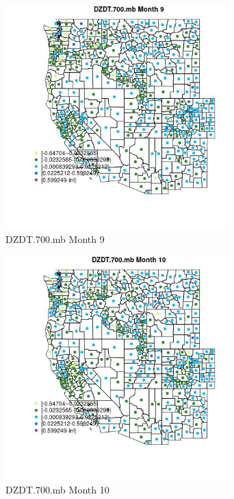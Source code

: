 \begin{figure} 
\centering  
\includegraphics[width=0.77\textwidth]{Code_Outputs/df_report_ML_predictors_CountyCentroid_Locations_Dates_2008-01-01to2018-12-31_MapObsMo9DZDT700mb.jpg} 
\caption{\label{fig:df_report_ML_predictors_CountyCentroid_Locations_Dates_2008-01-01to2018-12-31MapObsMo9DZDT700mb}DZDT.700.mb Month 9} 
\end{figure} 
 

\begin{figure} 
\centering  
\includegraphics[width=0.77\textwidth]{Code_Outputs/df_report_ML_predictors_CountyCentroid_Locations_Dates_2008-01-01to2018-12-31_MapObsMo10DZDT700mb.jpg} 
\caption{\label{fig:df_report_ML_predictors_CountyCentroid_Locations_Dates_2008-01-01to2018-12-31MapObsMo10DZDT700mb}DZDT.700.mb Month 10} 
\end{figure} 
 

